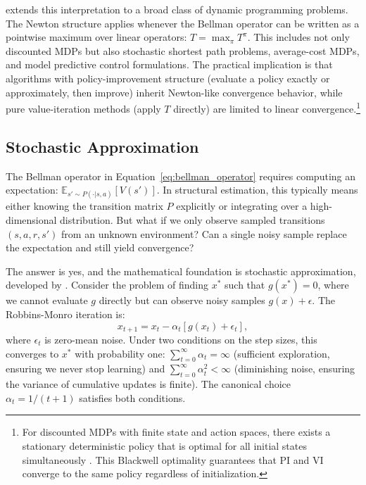 \citet{bertsekas2022newton} extends this interpretation to a broad class of dynamic programming problems. The Newton structure applies whenever the Bellman operator can be written as a pointwise maximum over linear operators: $T = \max_\pi T^\pi$. This includes not only discounted MDPs but also stochastic shortest path problems, average-cost MDPs, and model predictive control formulations. The practical implication is that algorithms with policy-improvement structure (evaluate a policy exactly or approximately, then improve) inherit Newton-like convergence behavior, while pure value-iteration methods (apply $T$ directly) are limited to linear convergence.\footnote{For discounted MDPs with finite state and action spaces, there exists a stationary deterministic policy that is optimal for all initial states simultaneously \citep{blackwell1962}. This Blackwell optimality guarantees that PI and VI converge to the same policy regardless of initialization.}


\subsection{Stochastic Approximation}
\label{sec:stochastic_approx}

The Bellman operator in Equation~\eqref{eq:bellman_operator} requires computing an expectation: $\mathbb{E}_{s' \sim P(\cdot|s,a)}[V(s')]$. In structural estimation, this typically means either knowing the transition matrix $P$ explicitly or integrating over a high-dimensional distribution. But what if we only observe sampled transitions $(s, a, r, s')$ from an unknown environment? Can a single noisy sample replace the expectation and still yield convergence?

The answer is yes, and the mathematical foundation is stochastic approximation, developed by \citet{Robbins1952}. Consider the problem of finding $x^*$ such that $g(x^*) = 0$, where we cannot evaluate $g$ directly but can observe noisy samples $g(x) + \epsilon$. The Robbins-Monro iteration is:
\begin{equation}
x_{t+1} = x_t - \alpha_t [g(x_t) + \epsilon_t],
\label{eq:robbins_monro}
\end{equation}
where $\epsilon_t$ is zero-mean noise. Under two conditions on the step sizes, this converges to $x^*$ with probability one: $\sum_{t=0}^\infty \alpha_t = \infty$ (sufficient exploration, ensuring we never stop learning) and $\sum_{t=0}^\infty \alpha_t^2 < \infty$ (diminishing noise, ensuring the variance of cumulative updates is finite). The canonical choice $\alpha_t = 1/(t+1)$ satisfies both conditions.


